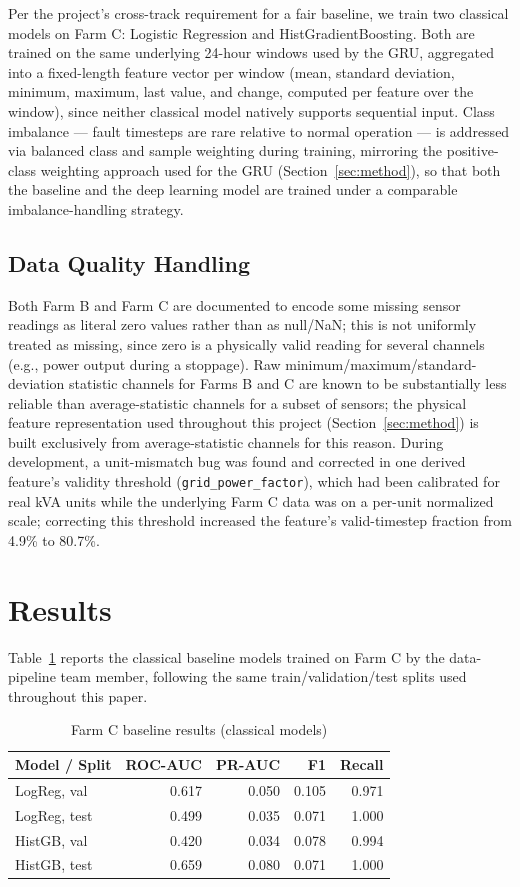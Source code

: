 \documentclass[conference]{IEEEtran}
\begin{document}
Per the project's cross-track requirement for a fair baseline, we train
two classical models on Farm C: Logistic Regression and
HistGradientBoosting. Both are trained on the same underlying 24-hour
windows used by the GRU, aggregated into a fixed-length feature vector
per window (mean, standard deviation, minimum, maximum, last value, and
change, computed per feature over the window), since neither classical
model natively supports sequential input. Class imbalance --- fault
timesteps are rare relative to normal operation --- is addressed via
balanced class and sample weighting during training, mirroring the
positive-class weighting approach used for the GRU
(Section~\ref{sec:method}), so that both the baseline and the deep
learning model are trained under a comparable imbalance-handling
strategy.
 
\subsection{Data Quality Handling}
 
Both Farm B and Farm C are documented to encode some missing sensor
readings as literal zero values rather than as null/NaN; this is not
uniformly treated as missing, since zero is a physically valid reading
for several channels (e.g., power output during a stoppage). Raw
minimum/maximum/standard-deviation statistic channels for Farms B and C
are known to be substantially less reliable than average-statistic
channels for a subset of sensors; the physical feature representation
used throughout this project (Section~\ref{sec:method}) is built
exclusively from average-statistic channels for this reason. During
development, a unit-mismatch bug was found and corrected in one derived
feature's validity threshold (\texttt{grid\_power\_factor}), which had
been calibrated for real kVA units while the underlying Farm C data was
on a per-unit normalized scale; correcting this threshold increased the
feature's valid-timestep fraction from 4.9\% to 80.7\%.
\section{Results}
\label{sec:results}
Table~\ref{tab:baseline} reports the classical baseline models trained on
Farm C by the data-pipeline team member, following the same
train/validation/test splits used throughout this paper.
 
\begin{table}[t]
\caption{Farm C baseline results (classical models)}
\label{tab:baseline}
\centering
\begin{tabular}{@{}lrrrr@{}}
\toprule
Model / Split & ROC-AUC & PR-AUC & F1 & Recall \\
\midrule
LogReg, val   & 0.617 & 0.050 & 0.105 & 0.971 \\
LogReg, test  & 0.499 & 0.035 & 0.071 & 1.000 \\
HistGB, val   & 0.420 & 0.034 & 0.078 & 0.994 \\
HistGB, test  & 0.659 & 0.080 & 0.071 & 1.000 \\
\bottomrule
\end{tabular}
\end{table}
 
\end{document}
